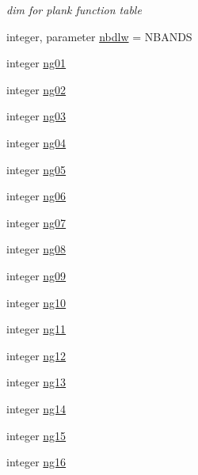 \begin{DoxyCompactItemize}
\begin{DoxyCompactList}\small\item\em dim for plank function table \end{DoxyCompactList}\item 
integer, parameter \hyperlink{namespacemodule__radlw__parameters_a39a115a97296886b2e6e37b220e942c7}{nbdlw} = N\+B\+A\+N\+DS
\item 
integer \hyperlink{namespacemodule__radlw__parameters_a54dc7913677d754af2b7ece9732b1280}{ng01}
\item 
integer \hyperlink{namespacemodule__radlw__parameters_aed66d66a4da744d27c13b57b41ba78c3}{ng02}
\item 
integer \hyperlink{namespacemodule__radlw__parameters_ad226d9951e041e991f463a9a90e7f68b}{ng03}
\item 
integer \hyperlink{namespacemodule__radlw__parameters_afd05a94bc29e5a5d792c0c140fe3a0c4}{ng04}
\item 
integer \hyperlink{namespacemodule__radlw__parameters_a1e70690afc3ba2cca4344d6df3d26ee8}{ng05}
\item 
integer \hyperlink{namespacemodule__radlw__parameters_a9a176786a0df1e65165db9b3c6f0e582}{ng06}
\item 
integer \hyperlink{namespacemodule__radlw__parameters_ab8f22f9ceabf3946452055c461476d49}{ng07}
\item 
integer \hyperlink{namespacemodule__radlw__parameters_a61aba0726187e15acf8bae5c377dbdd5}{ng08}
\item 
integer \hyperlink{namespacemodule__radlw__parameters_a2856b7576a44f2e35bd0fbc1e49bd270}{ng09}
\item 
integer \hyperlink{namespacemodule__radlw__parameters_aa764831e931a2ec27c763ebf957bbc67}{ng10}
\item 
integer \hyperlink{namespacemodule__radlw__parameters_a239b6c64459896a583e88c8ba2324348}{ng11}
\item 
integer \hyperlink{namespacemodule__radlw__parameters_a88f3b780d4dc9d4e45852fd41e111a21}{ng12}
\item 
integer \hyperlink{namespacemodule__radlw__parameters_a30e06652ca51875c17e56138eade5add}{ng13}
\item 
integer \hyperlink{namespacemodule__radlw__parameters_a32a603592af43d9de953c983a4e2f8c8}{ng14}
\item 
integer \hyperlink{namespacemodule__radlw__parameters_a1401bb43dbe665c21a17276cd82f4859}{ng15}
\item 
integer \hyperlink{namespacemodule__radlw__parameters_af6c5d2407ab29bb09fd2c297d4524e74}{ng16}

\end{DoxyCompactItemize}
